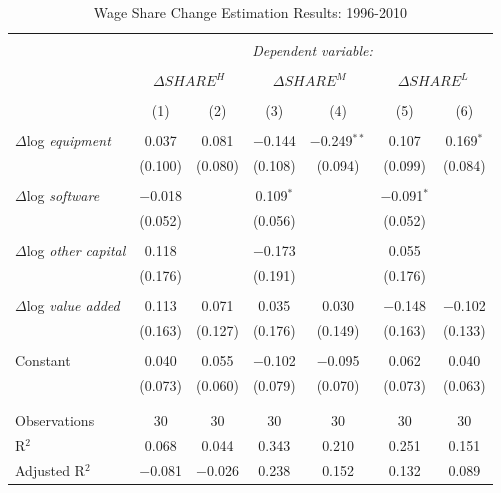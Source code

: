 \documentclass[a4paper]{article}
\begin{document}
\begin{table} \begin{center}
  \caption{Wage Share Change Estimation Results: 1996-2010} 
  \label{tbl:reg} 
\begin{tabular}{@{\extracolsep{5pt}}lcccccc} 
\\[-1.8ex]\hline 
\hline \\[-1.8ex] 
 & \multicolumn{6}{c}{\textit{Dependent variable:}} \\ 
\cline{2-7} 
\\[-1.8ex] & \multicolumn{2}{c}{$\Delta SHARE^H$} & \multicolumn{2}{c}{$\Delta SHARE^M$} & \multicolumn{2}{c}{$\Delta SHARE^L$} \\ 
\\[-1.8ex] & (1) & (2) & (3) & (4) & (5) & (6)\\ 
\hline \\[-1.8ex] 
 $\Delta$log {\em equipment} & 0.037 & 0.081 & $-$0.144 & $-$0.249$^{**}$ & 0.107 & 0.169$^{*}$ \\ 
  & (0.100) & (0.080) & (0.108) & (0.094) & (0.099) & (0.084) \\ 
  & & & & & & \\ 
 $\Delta$log {\em software} & $-$0.018 &  & 0.109$^{*}$ &  & $-$0.091$^{*}$ &  \\ 
  & (0.052) &  & (0.056) &  & (0.052) &  \\ 
  & & & & & & \\ 
 $\Delta$log {\em other capital} & 0.118 &  & $-$0.173 &  & 0.055 &  \\ 
  & (0.176) &  & (0.191) &  & (0.176) &  \\ 
  & & & & & & \\ 
 $\Delta$log {\em value added} & 0.113 & 0.071 & 0.035 & 0.030 & $-$0.148 & $-$0.102 \\ 
  & (0.163) & (0.127) & (0.176) & (0.149) & (0.163) & (0.133) \\ 
  & & & & & & \\ 
 Constant & 0.040 & 0.055 & $-$0.102 & $-$0.095 & 0.062 & 0.040 \\ 
  & (0.073) & (0.060) & (0.079) & (0.070) & (0.073) & (0.063) \\ 
  & & & & & & \\ 
\hline \\[-1.8ex] 
Observations & 30 & 30 & 30 & 30 & 30 & 30 \\ 
R$^{2}$ & 0.068 & 0.044 & 0.343 & 0.210 & 0.251 & 0.151 \\ 
Adjusted R$^{2}$ & $-$0.081 & $-$0.026 & 0.238 & 0.152 & 0.132 & 0.089 \\ 

\end{tabular}
\end{center}
\end{table}
\end{document}
